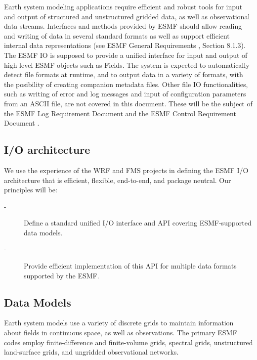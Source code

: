 

Earth system modeling applications require efficient and robust tools
for input and output of structured and unstructured gridded data, as
well as observational data streams.  Interfaces and methods provided
by ESMF should allow reading and writing of data in several standard
formats as well as support efficient internal data representations
(see ESMF General Requirements \cite{ESMFGenReq}, Section 8.1.3). 
The ESMF IO is supposed to provide a unified interface for input and output 
of high level ESMF objects such as Fields.  The system is expected to 
automatically detect file formats at runtime, and to output data in a variety 
of formats, with the posibility of creating companion metadata files. Other 
file IO functionalities, such as writing of error and log messages and input 
of configuration parameters from an ASCII file, are not covered in this
document. 
These will be the subject of the ESMF Log Requirement Document and the ESMF 
Control Requirement Document \cite{ESMF-Log-Req, ESMF-Control-Req}.


\subsection{I/O architecture}

We use the experience of the WRF \cite{WRF-Software} and FMS 
\cite{Balaji_Parallel_IO_2000}  projects in defining the 
ESMF I/O architecture that is efficient, flexible, end-to-end, and package 
neutral. Our principles will be:

\begin{description}
\item[-] Define a standard unified I/O interface and API covering 
         ESMF-supported data models.
\item[-] Provide efficient implementation of this API for multiple data 
         formats supported by the ESMF. 
\end{description}



\subsection{Data Models}

Earth system models use a variety of discrete grids to maintain information 
about fields in continuous space, as well as observations. The primary ESMF 
codes employ finite-difference and finite-volume grids, spectral grids, 
unstructured land-surface grids, and ungridded observational networks.


